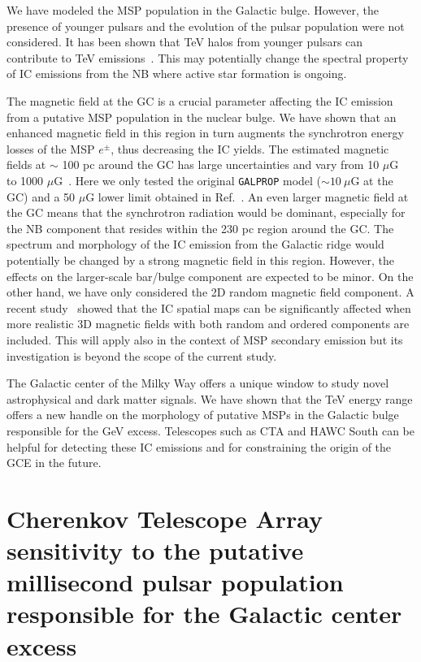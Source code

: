 \documentclass[doublespace,draft,nopageskip]{VTthesis} %
\begin{document}
We have modeled the MSP population in the Galactic bulge. However, the presence of younger pulsars and the evolution of the pulsar population were not considered. It has been shown that TeV halos from younger pulsars can contribute to TeV emissions~\cite{Hooper:2017rzt}. This may potentially change the spectral property of IC emissions from the NB where active star formation is ongoing.

The magnetic field at the GC is a crucial parameter affecting the IC emission from a putative MSP population in the nuclear bulge. We have shown that an enhanced magnetic field in this region in turn augments the synchrotron energy losses of the MSP $e^\pm$, thus decreasing the IC yields. The estimated magnetic fields at $\sim$ 100 pc around the GC has large uncertainties and vary from 10 $\mu$G~\cite{LaRosa:2005ai} to 1000 $\mu$G~\cite{Morris1989fd}. Here we only tested the original \texttt{GALPROP} model ($\sim 10\ \mu$G at the GC) and a 50 $\mu$G lower limit obtained in Ref.~\cite{Crocker:2010xc}. An even larger magnetic field at the GC means that the synchrotron radiation would be dominant, especially for the NB component that resides within the 230 pc region around the GC. The spectrum and morphology of the IC emission from the Galactic ridge would potentially be changed by a strong magnetic field in this region. However, the effects on the larger-scale bar/bulge component are expected to be minor. On the other hand, we have only considered the 2D random magnetic field component. A recent study~\cite{Orlando:2019vmq} showed that the IC spatial maps can be significantly affected when more realistic 3D magnetic fields with both random and ordered components are included. This will apply also in the context of MSP secondary emission but its investigation is beyond the scope of the current study.

The Galactic center of the Milky Way offers a unique window to study novel astrophysical and dark matter signals. We have shown that the TeV energy range offers a new handle on the morphology of putative MSPs in the Galactic bulge responsible for the GeV excess. Telescopes such as CTA and HAWC South can be helpful for detecting these IC emissions and for constraining the origin of the GCE in the future.

\chapter{Cherenkov Telescope Array sensitivity to the putative millisecond pulsar population responsible for the Galactic center excess}\label{ch:CTA}
\end{document}
